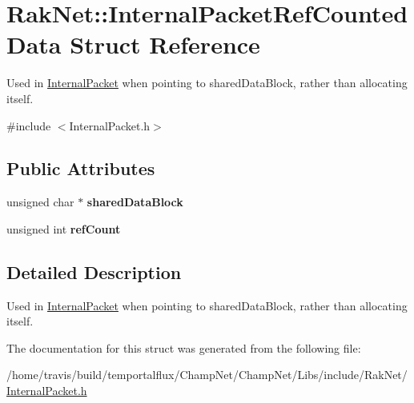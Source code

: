 \hypertarget{struct_rak_net_1_1_internal_packet_ref_counted_data}{\section{Rak\-Net\-:\-:Internal\-Packet\-Ref\-Counted\-Data Struct Reference}
\label{struct_rak_net_1_1_internal_packet_ref_counted_data}
}


Used in \hyperlink{struct_rak_net_1_1_internal_packet}{Internal\-Packet} when pointing to shared\-Data\-Block, rather than allocating itself.  




{\ttfamily \#include $<$Internal\-Packet.\-h$>$}

\subsection*{Public Attributes}
\begin{DoxyCompactItemize}
\item 
\hypertarget{struct_rak_net_1_1_internal_packet_ref_counted_data_a38338ab5eb3281acad479fb1b805911e}{unsigned char $\ast$ {\bfseries shared\-Data\-Block}}\label{struct_rak_net_1_1_internal_packet_ref_counted_data_a38338ab5eb3281acad479fb1b805911e}

\item 
\hypertarget{struct_rak_net_1_1_internal_packet_ref_counted_data_a423d10c2692d5f7037113e2962b0af6a}{unsigned int {\bfseries ref\-Count}}\label{struct_rak_net_1_1_internal_packet_ref_counted_data_a423d10c2692d5f7037113e2962b0af6a}

\end{DoxyCompactItemize}


\subsection{Detailed Description}
Used in \hyperlink{struct_rak_net_1_1_internal_packet}{Internal\-Packet} when pointing to shared\-Data\-Block, rather than allocating itself. 

The documentation for this struct was generated from the following file\-:\begin{DoxyCompactItemize}
\item 
/home/travis/build/temportalflux/\-Champ\-Net/\-Champ\-Net/\-Libs/include/\-Rak\-Net/\hyperlink{_internal_packet_8h}{Internal\-Packet.\-h}\end{DoxyCompactItemize}
